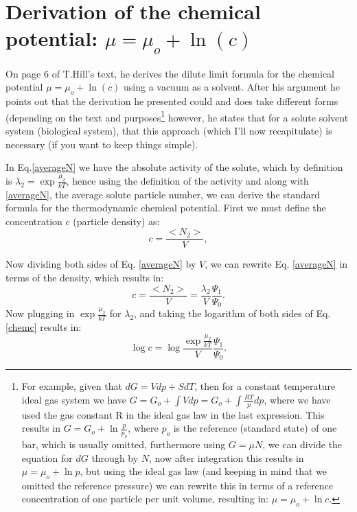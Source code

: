 \section{Derivation of the chemical potential: $\mu=\mu_o + \ln{(c)}$} 
On page 6 of T.Hill's text\cite{hill}, he derives the dilute limit formula for the chemical potential $\mu=\mu_o + \ln{(c)}$ using a vacuum as a solvent.  After his argument he points out that the derivation he presented could and does take different forms (depending on the text and purposes\footnote{For example, given that $dG=Vdp +SdT$, then for a constant temperature ideal gas system we have $G = G_o +\int V dp = G_o + \int \frac{RT}{p}dp$, where we have used the gas constant R in the ideal gas law in the last expression.  This results in $G=G_o +\ln{\frac{p}{p_o}}$, where $p_o$ is the reference (standard state) of one bar, which is usually omitted, furthermore using $G=\mu N$, we can divide the equation for $dG$ through by $N$, now after integration this results in $\mu=\mu_o +\ln{p}$, but using the ideal gas law (and keeping in mind that we omitted the reference pressure) we can rewrite this in terms of a reference concentration of one particle per unit volume, resulting in: $\mu=\mu_o +\ln{c}$.} however, he states that for a solute solvent system (biological system), that this approach (which I'll now recapitulate) is necessary (if you want to keep things simple).
 
In Eq.\ref{averageN} we have the absolute activity of the solute, which by definition is $\lambda_{2}=\exp{\frac{\mu_{2}}{kT}}$, hence using the definition of the activity and along with \ref{averageN}, the average solute particle number, we can derive the standard formula for the thermodynamic chemical potential.  First we must define the concentration $c$ (particle density) as:
\begin{equation}
 c = \frac{<N_2>}{V},
 \end{equation}

 Now dividing both sides of Eq. \ref{averageN} by $V$, we can rewrite Eq. 
\ref{averageN} in terms of the density, which results in:
\begin{equation}\label{chemc}
c =  \frac{< N_2 >}{V} =\frac{\lambda_{2}}{V} \frac{ \Psi_1}{\Psi_0}.
 \end{equation}
Now plugging in $\exp{\frac{\mu_{2}}{kT}}$ for $\lambda_{2}$, and taking the logarithm of both sides of Eq. \ref{chemc} results in:
\begin{equation}\label{chemc2}
\log{c} = \log{\frac{\exp{\frac{\mu_{2}}{kT}}}{V} \frac{ \Psi_1}{\Psi_0} }.
 \end{equation}
 
